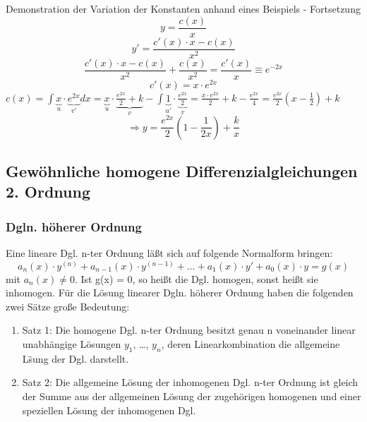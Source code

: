 \documentclass[
	11pt, %
]{beamer}
\begin{document}
\begin{frame}
	\begin{exampleblock}{Demonstration der Variation der Konstanten anhand eines Beispiels - Fortsetzung}
		\begin{equation}
			y = \frac{c(x)}{x}
		\end{equation}
		\begin{equation}
			y' = \frac{c'(x)\cdot x - c(x)}{x^2}
		\end{equation}
		\begin{equation}
			\frac{c'(x)\cdot x - c(x)}{x^2}+\frac{c(x)}{x^2}= \frac{c'(x)}{x}\equiv e^{-2x}
		\end{equation}
		\begin{equation}
			c'(x)=x\cdot e^{2x}
		\end{equation}
			$c(x)=\int \underbrace{x}_{u}\cdot \underbrace{e^{2x}}_{v'}dx=\underbrace{x}_{u}\cdot\underbrace{\frac{e^{2x}}{2}+k}_{v}-\int\underbrace{1}_{u'}\cdot\underbrace{\frac{e^{2x}}{2}}_{v}=
			 \frac{x\cdot e^{2x}}{2}+k-\frac{e^{2x}}{4}=\frac{e^{2x}}{2}(x-\frac{1}{2})+k$
		\begin{equation}
			\Rightarrow y=\frac{e^{2x}}{2}(1-\frac{1}{2x})+\frac{k}{x}
		\end{equation}
	\end{exampleblock}

\end{frame}
\subsection{Gew\"ohnliche homogene Differenzialgleichungen 2. Ordnung}
\begin{frame}
	\frametitle{Dgln. h\"oherer Ordnung}
	Eine lineare Dgl. n-ter Ordnung läßt sich auf folgende Normalform bringen:
	\begin{equation}
		a_n(x)\cdot y^{(n)} + a_{n-1}(x)\cdot y^{(n-1)} + \ldots + a_1(x)\cdot y' + a_0(x)\cdot y = g(x) \label{normalform}
	\end{equation}
	mit $a_n(x) \neq  0$. Ist g(x) = 0, so heißt die Dgl. homogen, sonst heißt sie inhomogen. Für die L\"osung linearer Dgln. h\"oherer Ordnung haben die folgenden zwei S\"atze große Bedeutung: 
	\begin{enumerate}
		\item Satz 1: Die homogene Dgl. n-ter Ordnung besitzt genau n voneinander linear unabh\"angige Lösungen $y_1$, \ldots , $y_n$, deren Linearkombination die allgemeine L\"sung der Dgl. darstellt. 
			\item Satz 2: Die allgemeine L\"osung der inhomogenen Dgl. n-ter Ordnung ist gleich der Summe aus der allgemeinen L\"osung der zugeh\"origen homogenen und einer speziellen L\"osung der inhomogenen Dgl.
	\end{enumerate}
\end{frame}
\end{document}
